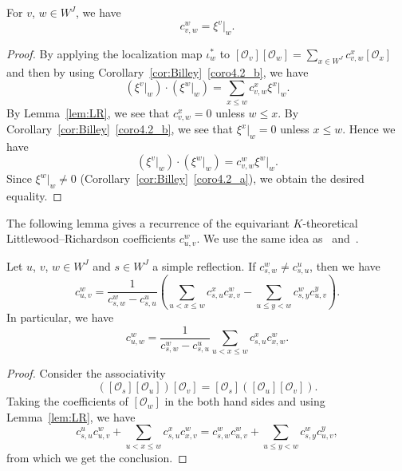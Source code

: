 \documentclass[ALCO,ThmDefs,Unicode,epreuves]{cedram}
\newcommand\OO{\mathcal{O}}
\begin{document}
\begin{prop}
\label{prop:LR=xi}
For $v$, $w \in W^J$, we have
\begin{equation}
\label{eq:LR=xi}
c^w_{v,w} = \xi^v|_w.
\end{equation}
\end{prop}

\begin{proof}
By applying the localization map $\iota_w^*$ to 
$[\OO_v] [\OO_w] = \sum_{x \in W^J} c^x_{v,w} [\OO_x]$ 
and then by using Corollary~\ref{cor:Billey}~\ref{coro4.2_b}, we have
$$
\left( \xi^v|_w \right) \cdot \left( \xi^w|_w \right)
 =
\sum_{x \le w} c^x_{v,w} \xi^x|_w.
$$
By Lemma~\ref{lem:LR}, we see that $c^x_{v,w} = 0$ unless $w \le x$.
By Corollary~\ref{cor:Billey}~\ref{coro4.2_b}, we see that $\xi^x|_w = 0$ unless $x \le w$.
Hence we have
$$
\left( \xi^v|_w \right) \cdot \left( \xi^w|_w \right)
 =
c^w_{v,w} \xi^w|_w.
$$
Since $\xi^w|_w \neq 0$ (Corollary~\ref{cor:Billey}~\ref{coro4.2_a}), we obtain the desired equality.
\end{proof}

The following lemma gives a recurrence of the equivariant $K$-theoretical 
Little\-wood--Richardson coefficients $c^w_{u,v}$.
We use the same idea as~\cite[Corollary~6.5]{M} and~\cite[Proposition~3.1]{PY}.

\begin{lemm}
\label{lem:recLR}
Let $u$, $v$, $w \in W^J$ and $s \in W^J$ a simple reflection.
If $c^w_{s,w} \neq c^u_{s,u}$, then we have
$$
c^w_{u,v}
 =
\frac{ 1 }
 { c^w_{s,w} - c^u_{s,u} }
\left(
 \sum_{u < x \le w} c^x_{s,u} c^w_{x,v}
 -
 \sum_{u \le y < w} c^w_{s,y} c^y_{u,v}
\right).
$$
In particular, we have
\begin{equation}
\label{eq:recLR}
c^w_{u,w}
 =
\frac{ 1 }
 { c^w_{s,w} - c^u_{s,u} }
\sum_{u < x \le w}
 c^x_{s,u} c^w_{x,w}.
\end{equation}
\end{lemm}

\begin{proof}
Consider the associativity
$$
\left( [\OO_s] [\OO_u] \right) [\OO_v]
 =
[\OO_s] \left( [\OO_u] [\OO_v] \right).
$$
Taking the coefficients of $[\OO_w]$ in the both hand sides and using Lemma~\ref{lem:LR}, 
we have
$$
c^u_{s,u} c^w_{u,v}
 +
\sum_{u < x \le w} c^x_{s,u} c^w_{x,v}
 =
c^w_{s,w} c^w_{u,v}
 +
\sum_{u \le y < w} c^w_{s,y} c^y_{u,v},
$$
from which we get the conclusion. 
\end{proof}
\end{document}
